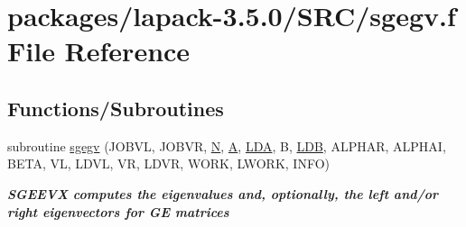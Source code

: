 \hypertarget{sgegv_8f}{}\section{packages/lapack-\/3.5.0/\+S\+R\+C/sgegv.f File Reference}
\label{sgegv_8f}
\subsection*{Functions/\+Subroutines}
\begin{DoxyCompactItemize}
\item 
subroutine \hyperlink{group__realGEeigen_ga80fd7fa3159b96cf467a9584f6464310}{sgegv} (J\+O\+B\+V\+L, J\+O\+B\+V\+R, \hyperlink{polmisc_8c_a0240ac851181b84ac374872dc5434ee4}{N}, \hyperlink{classA}{A}, \hyperlink{example__user_8c_ae946da542ce0db94dced19b2ecefd1aa}{L\+D\+A}, B, \hyperlink{example__user_8c_a50e90a7104df172b5a89a06c47fcca04}{L\+D\+B}, A\+L\+P\+H\+A\+R, A\+L\+P\+H\+A\+I, B\+E\+T\+A, V\+L, L\+D\+V\+L, V\+R, L\+D\+V\+R, W\+O\+R\+K, L\+W\+O\+R\+K, I\+N\+F\+O)
\begin{DoxyCompactList}\small\item\em {\bfseries  S\+G\+E\+E\+V\+X computes the eigenvalues and, optionally, the left and/or right eigenvectors for G\+E matrices} \end{DoxyCompactList}\end{DoxyCompactItemize}

